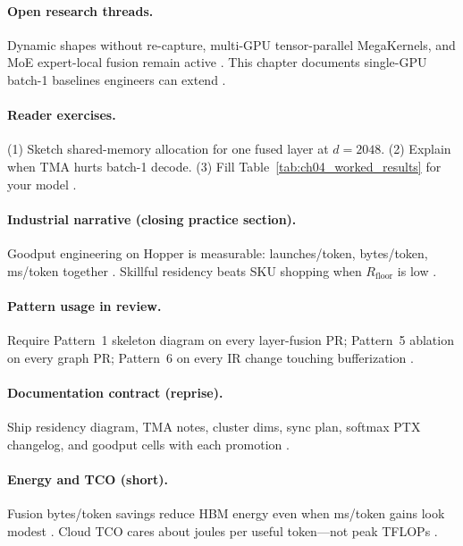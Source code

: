 \paragraph{Open research threads.}
Dynamic shapes without re-capture, multi-GPU tensor-parallel MegaKernels, and MoE expert-local fusion remain active \citep{liu2024deepseekv3,kwon2023vllm,patel2025llminference}.
This chapter documents single-GPU batch-1 baselines engineers can extend \citep{taxbreak2026,memoryfloor2026}.

\paragraph{Reader exercises.}
(1) Sketch shared-memory allocation for one fused layer at $d{=}2048$. (2) Explain when TMA hurts batch-1 decode. (3) Fill Table~\ref{tab:ch04_worked_results} for your model \citep{taxbreak2026,memoryfloor2026,yirage2026,patel2025llminference,dao2022flashattention,semianalysis2024tma}.

\paragraph{Industrial narrative (closing practice section).}
Goodput engineering on Hopper is measurable: launches/token, bytes/token, ms/token together \citep{taxbreak2026,memoryfloor2026,patel2025llminference,dlbook}.
Skillful residency beats SKU shopping when $R_{\mathrm{floor}}$ is low \citep{memoryfloor2026,taxbreak2026,dao2022flashattention,yirage2026}.

\paragraph{Pattern usage in review.}
Require Pattern~1 skeleton diagram on every layer-fusion PR; Pattern~5 ablation on every graph PR; Pattern~6 on every IR change touching bufferization \citep{yirage2026,chen2020compilerbasedhardw,taxbreak2026,memoryfloor2026,patel2025llminference}.

\paragraph{Documentation contract (reprise).}
Ship residency diagram, TMA notes, cluster dims, sync plan, softmax PTX changelog, and goodput cells with each promotion \citep{taxbreak2026,memoryfloor2026,yirage2026,patel2025llminference,semianalysis2024tma}.

\paragraph{Energy and TCO (short).}
Fusion bytes/token savings reduce HBM energy even when ms/token gains look modest \citep{memoryfloor2026,patel2025llminference,taxbreak2026,amd2024xdna}.
Cloud TCO cares about joules per useful token---not peak TFLOPs \citep{taxbreak2026,dlbook}.

